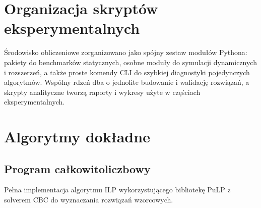 \section{Organizacja skryptów eksperymentalnych}
Środowisko obliczeniowe zorganizowano jako spójny zestaw modułów
Pythona: pakiety do benchmarków statycznych, osobne moduły do
symulacji dynamicznych i rozszerzeń, a także proste komendy CLI do
szybkiej diagnostyki pojedynczych algorytmów. Wspólny rdzeń dba o
jednolite budowanie i walidację rozwiązań, a skrypty analityczne
tworzą raporty i wykresy użyte w częściach eksperymentalnych.

\section{Algorytmy dokładne}
\subsection{Program całkowitoliczbowy}
Pełna implementacja algorytmu ILP wykorzystującego bibliotekę PuLP
z solverem CBC do wyznaczania rozwiązań wzorcowych.

